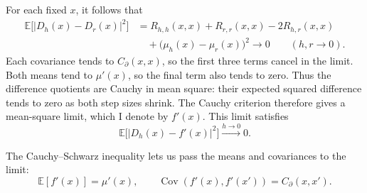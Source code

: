 \documentclass[11pt,letterpaper]{article}
\begin{document}
For each fixed $x$, it follows that
\begin{align*}
  \mathbb E\bigl[|D_h(x)-D_r(x)|^2\bigr]
   & =R_{h,h}(x,x)+R_{r,r}(x,x)-2R_{h,r}(x,x) \\
   & \quad+\bigl(\mu_h(x)-\mu_r(x)\bigr)^2
  \longrightarrow0\qquad(h,r\to0).
\end{align*}
Each covariance tends to $C_{\partial}(x,x)$, so the first three terms
cancel in the limit.
Both means tend to $\mu'(x)$, so the final term
also tends to zero.
Thus the difference quotients are Cauchy in mean square: their expected
squared difference tends to zero as both step sizes shrink.
The Cauchy
criterion therefore gives a mean-square limit, which I denote by $f'(x)$.
This limit satisfies
\[
  \mathbb E\bigl[|D_h(x)-f'(x)|^2\bigr]\xrightarrow{h\to0}0.
\]

The Cauchy--Schwarz inequality lets us pass the means and covariances
to the limit:
\[
  \mathbb E[f'(x)]=\mu'(x),
  \qquad
  \operatorname{Cov}(f'(x),f'(x'))=C_{\partial}(x,x').
\]
\end{document}
